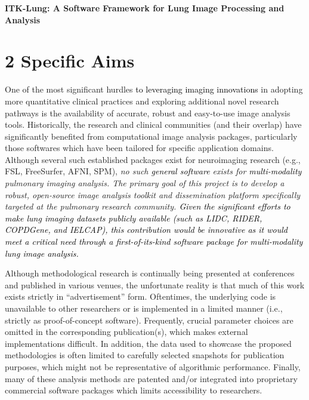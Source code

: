\documentclass[11pt,]{article}
\title{}
\author{}
\date{}
\begin{document}
\maketitle


\begin{center}
{\Large \bf ITK-Lung:  A Software Framework for Lung Image Processing and Analysis}
\end{center}

\section{2 Specific Aims}\label{specific-aims}

One of the most significant hurdles
\textcolor{black}{to leveraging imaging innovations} in adopting more
quantitative clinical practices and exploring additional novel research
pathways is the availability of accurate, robust and easy-to-use image
analysis tools. Historically, the research and clinical communities (and
their overlap) have significantly benefited from computational image
analysis packages, particularly those softwares which have been tailored
for specific application domains. Although several such established
packages exist for neuroimaging research (e.g., FSL, FreeSurfer, AFNI,
SPM), \emph{no such \textcolor{black}{general
software} exists for \textcolor{black}{multi-modality} pulmonary imaging
analysis. The primary goal of this project is to develop a robust,
open-source image analysis toolkit and dissemination platform
specifically targeted at the pulmonary research community.
\textcolor{black}{Given the significant efforts
to make lung imaging datasets publicly available (such as LIDC, RIDER, COPDGene,
and IELCAP), this contribution would be innovative as it would meet a critical
need through a first-of-its-kind software package for multi-modality lung image analysis.}}

Although methodological research is continually being presented at
conferences and published in various venues, the unfortunate reality is
that much of this work exists strictly in ``advertisement'' form.
Oftentimes, the underlying code is unavailable to other researchers or
is implemented in a limited manner (i.e., strictly as proof-of-concept
software). Frequently, crucial parameter choices are omitted in the
corresponding publication(s), which makes external implementations
difficult. In addition, the data used to showcase the proposed
methodologies is often limited to carefully selected snapshots for
publication purposes, which might not be representative of algorithmic
performance. Finally, many of these analysis methods are patented and/or
integrated into proprietary commercial software packages which limits
accessibility to researchers.
\end{document}

